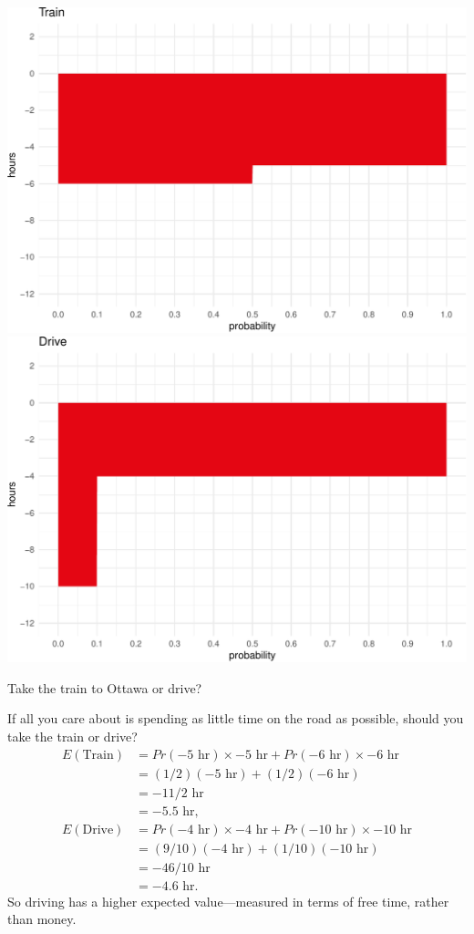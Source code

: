 \documentclass[justified]{tufte-book}
\newcommand{\p}{Pr}
\newcommand{\E}{E}
\theoremstyle{definition}
\theoremstyle{definition}
\theoremstyle{definition}
\theoremstyle{remark}
\begin{document}
\begin{marginfigure}
\includegraphics{_main_files/figure-latex/unnamed-chunk-98-1} \includegraphics{_main_files/figure-latex/unnamed-chunk-98-2} \caption[Take the train to Ottawa or drive?]{Take the train to Ottawa or drive?}\label{fig:unnamed-chunk-98}
\end{marginfigure}

If all you care about is spending as little time on the road as possible, should you take the train or drive?
\[
  \begin{aligned}
    \E(\mbox{Train}) &= \p(-5{\mbox{ hr}}) \times -5{\mbox{ hr}}+ \p(-6{\mbox{ hr}}) \times -6{\mbox{ hr}}\\
                     &= (1/2)(-5{\mbox{ hr}}) + (1/2)(-6{\mbox{ hr}})\\
                     &= -11/2{\mbox{ hr}}\\
                     &= -5.5{\mbox{ hr}},\\
    \E(\mbox{Drive}) &= \p(-4{\mbox{ hr}}) \times -4{\mbox{ hr}}+ \p(-10{\mbox{ hr}}) \times -10{\mbox{ hr}}\\
                     &= (9/10)(-4{\mbox{ hr}}) + (1/10)(-10{\mbox{ hr}})\\
                     &= -46/10{\mbox{ hr}}\\
                     &= -4.6{\mbox{ hr}}.
  \end{aligned}
\]
So driving has a higher expected value---measured in terms of free time, rather than money.
\end{document}
